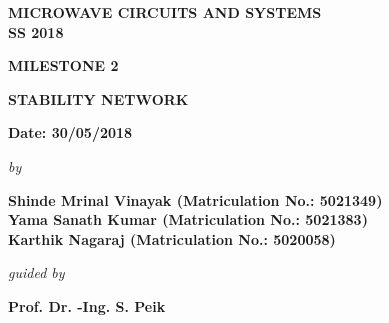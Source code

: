 \begin{center}
%
\begin{figure}[H]
{\centering {}\par}
\end{figure}
\vspace{0.2cm}
\begin{large}
\bfseries{MICROWAVE CIRCUITS AND SYSTEMS}\\
\vspace{1.1cm}
\bfseries{ SS 2018}\\
\end{large}
\vspace{1.5cm}

\bfseries{MILESTONE 2}\\
\vspace{1.6cm}
\begin{Large}
{\bfseries STABILITY NETWORK }\\
\end{Large}
\vspace{2.0cm}
{\bfseries Date: 30/05/2018 }\\
\vspace{1.5cm}
\begin{small}
\emph{by}\\
\end{small}
\vspace{0.4cm}
\bfseries{Shinde Mrinal Vinayak (Matriculation No.: 5021349) \\
Yama Sanath Kumar (Matriculation No.: 5021383) \\
Karthik Nagaraj (Matriculation No.: 5020058)}\\
\vspace{2.2cm}
\begin{small}
\emph{guided by}\\
\end{small}
\vspace{0.3cm}
{\bfseries \large Prof. Dr. -Ing. S. Peik} \\
\vspace{0.1cm}
\end{center}
